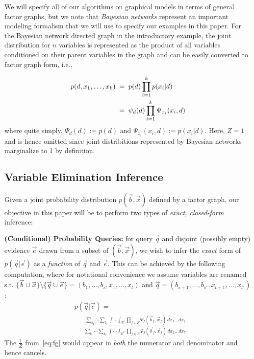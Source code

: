 \documentclass[letterpaper]{article}
\renewcommand{\-}{\text{-}}
\begin{document}
We will specify all of our algorithms on graphical models in terms of 
general factor graphs, but we note that \emph{Bayesian networks} represent
an important modeling formalism that we will use to specify our examples
in this paper.  For the Bayesian network directed graph 
in the introductory example, the joint distribution
for $n$ variables is represented as the product of all variables
conditioned on their parent variables in the graph and can be
easily converted to factor graph form, i.e., 
{{\footnotesize
\vspace{-2mm}
\begin{align}
p(d,x_1,\ldots,x_k) \; & = \; p(d) \prod_{i=1}^k p(x_i|d) \nonumber \\
& = \; \psi_d(d) \prod_{i=1}^k \Psi_{x_i} (x_i,d) \label{eq:bn}
\vspace{-1mm}
\end{align}
}
where quite simply, $\Psi_{d} (d) := p(d)$ and $\Psi_{x_i} (x_i,d) :=
p(x_i|d)$.  Here, $Z=1$ and is hence omitted since joint distribitions
represented by Bayesian networks marginalize to 1 by definition.


\subsection{Variable Elimination Inference}

Given a joint probability distribution $p(\vec{b},\vec{x})$
defined by a factor graph, our objective in this paper will
be to perform two types of \emph{exact, closed-form} inference:

{\bf (Conditional) Probability Queries:} for query
$\vec{q}$ and disjoint (possibly empty) 
evidence $\vec{e}$ drawn from 
a subset of $(\vec{b},\vec{x})$, we wish to infer 
the \emph{exact}
form of $p(\vec{q}|\vec{e})$ as a \emph{function} of 
$\vec{q}$ and $\vec{e}$.  This can be 
achieved by the following computation, where 
for notational convenience we assume variables are renamed s.t. 
$\{ \vec{b} \cup \vec{x} \} \setminus \{ \vec{q} \cup \vec{e} \} = ( b_1,\ldots,b_s,x_1,\ldots,x_t)$ and 
$\vec{q} = (b_{s+1},\ldots,b_{s'},x_{t+1},\ldots,x_{t'})$:
{\footnotesize
\begin{align}
& p(\vec{q}|\vec{e}) = \label{eq:cprob}\\
& = \frac{\sum_{b_1} \cdots \sum_{b_s} \int \cdots \int_{\mathbb{R}^t} \prod_{f \in F} \Psi_f(\vec{b}_f,\vec{x}_f) \, dx_1 \ldots dx_t}
{\sum_{b_1} \cdots \sum_{b_{s'}} \int \cdots \int_{\mathbb{R}^{t'}} \prod_{f \in F} \Psi_f(\vec{b}_f,\vec{x}_f) \, dx_1 \ldots dx_{t'}} \nonumber
\end{align}
}
The $\frac{1}{Z}$ from~\eqref{eq:fg} would appear in \emph{both}
the numerator and denominator and hence cancels.

}
\end{document}
